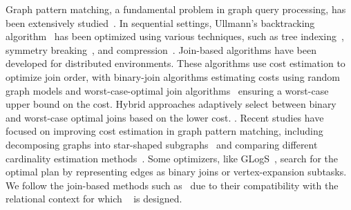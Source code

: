  Graph pattern matching, a fundamental problem in graph query processing, has been extensively studied~\cite{angles2017foundations}. In sequential settings, Ullmann's backtracking algorithm~\cite{ullmann1976algorithm} has been optimized using various techniques, such as tree indexing~\cite{shang2008quicksi}, symmetry breaking~\cite{han13turbo}, and compression~\cite{bi2016efficient}. 
Join-based algorithms have been developed for distributed environments. These algorithms use cost estimation to optimize join order, with binary-join algorithms\cite{lai2015scalable, lai2019distributed} estimating costs using random graph models and worst-case-optimal join algorithms~\cite{ammar2018distributed} ensuring a worst-case upper bound on the cost. Hybrid approaches\cite{mhedhbi2019optimizing, huge} adaptively select between binary and worst-case optimal joins based on the lower cost. 
.
Recent studies have focused on improving cost estimation in graph pattern matching, including decomposing graphs into star-shaped subgraphs~\cite{cset} and comparing different cardinality estimation methods~\cite{gcare}. Some optimizers, like GLogS~\cite{GLogS}, search for the optimal plan by representing edges as binary joins or vertex-expansion subtasks. %
We follow the join-based methods such as~\cite{huge,GLogS} due to their compatibility with the relational context for which \name~ is designed. %


